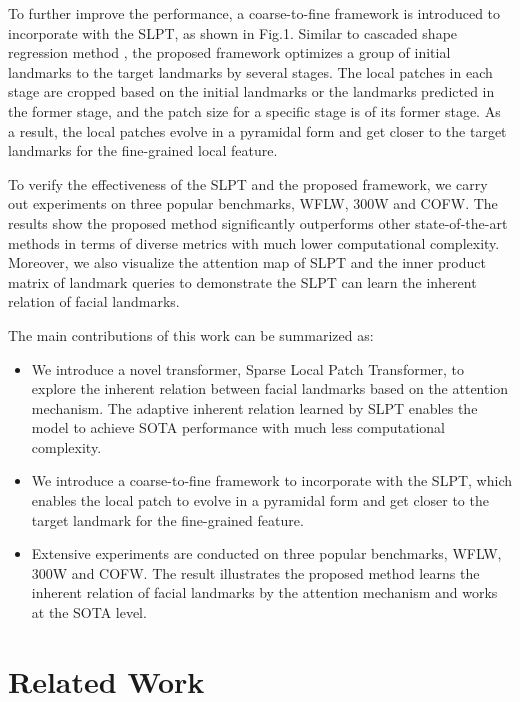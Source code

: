 \documentclass[10pt,twocolumn,letterpaper]{article}
\begin{document}
To further improve the performance, a coarse-to-fine framework is introduced to incorporate with the SLPT, as shown in Fig.1. Similar to cascaded shape regression method \cite{CFSS, DAN, DAC-CSR}, the proposed framework optimizes a group of initial landmarks to the target landmarks by several stages. The local patches in each stage are cropped based on the initial landmarks or the landmarks predicted in the former stage, and the patch size for a specific stage is  of its former stage. As a result, the local patches evolve in a pyramidal form and get closer to the target landmarks for the fine-grained local feature.







To verify the effectiveness of the SLPT and the proposed framework, we carry out experiments on three popular benchmarks, WFLW\cite{LAB}, 300W\cite{300W} and COFW\cite{COFW}. The results show the proposed method significantly outperforms other state-of-the-art methods in terms of diverse metrics with much lower computational complexity. Moreover, we also visualize the attention map of SLPT and the inner product matrix of landmark queries to demonstrate the SLPT can learn the inherent relation of facial landmarks. 

The main contributions of this work can be summarized as:

\begin{itemize}
	\item We introduce a novel transformer, Sparse Local Patch Transformer, to explore the inherent relation between facial landmarks based on the attention mechanism. The adaptive inherent relation learned by SLPT enables the model to achieve SOTA performance with much less computational complexity.
	\item We introduce a coarse-to-fine framework to incorporate with the SLPT, which enables the local patch to evolve in a pyramidal form and get closer to the target landmark for the fine-grained feature.
	\item Extensive experiments are conducted on three popular benchmarks, WFLW, 300W and COFW. The result illustrates the proposed method learns the inherent relation of facial landmarks by the attention mechanism and works at the SOTA level. 
\end{itemize}

\section{Related Work}
\end{document}

